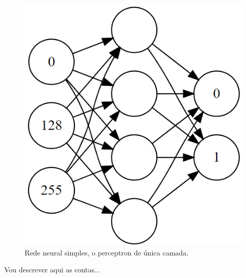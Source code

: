 \begin{figure}[htb]
\centering
\includegraphics[width=12cm]{figuras/perceptron}
\caption{\label{fig:perceptron}Rede neural simples, o perceptron de única camada. }
\end{figure}

Vou descrever aqui as contas...